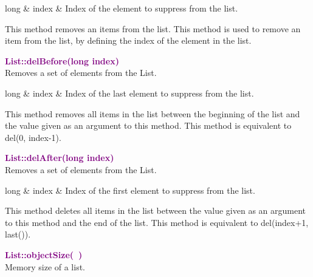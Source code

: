 \begin{tcolorbox}[width=\textwidth,myArgs,tabularx={ll|R}]
long & index & Index of the element to suppress from the list.
\end{tcolorbox}

This method removes an items from the list.
This method is used to remove an item from the list, by defining the index of the element in the list.

\textcolor{purple}{\textbf{List::delBefore(long index)}}\label{List::delBefore(long index)}\\
Removes a set of elements from the List.

\begin{tcolorbox}[width=\textwidth,myArgs,tabularx={ll|R}]
long & index & Index of the last element to suppress from the list.
\end{tcolorbox}

This method removes all items in the list between the beginning of the list and the value given as an argument to this method.
This method is equivalent to del(0, index-1).

\textcolor{purple}{\textbf{List::delAfter(long index)}}\label{List::delAfter(long index)}\\
Removes a set of elements from the List.

\begin{tcolorbox}[width=\textwidth,myArgs,tabularx={ll|R}]
long & index & Index of the first element to suppress from the list.
\end{tcolorbox}

This method deletes all items in the list between the value given as an argument to this method and the end of the list.
This method is equivalent to del(index+1, last()).

\textcolor{purple}{\textbf{List::objectSize(~)}}\label{List::objectSize()}\\
Memory size of a list.

